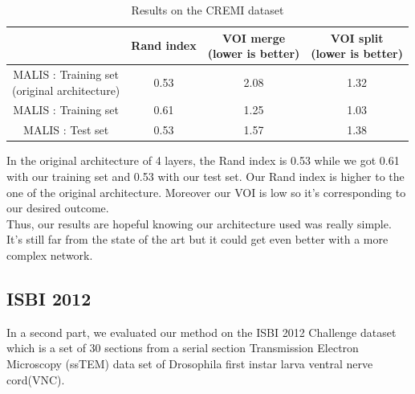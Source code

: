 \begin{table}[!htbp]
	\centering
	\begin{tabular}{|c|c|c|c|}
		\hline
		& Rand index & \thead{VOI merge \\(lower is better)} & \thead{VOI split\\(lower is better)} \\
		\hline
		\makecell{MALIS : Training set \\(original architecture)} & 0.53 & 2.08 & 1.32\\
		\hline
		MALIS : Training set & 0.61 & 1.25 & 1.03\\
		\hline
		MALIS : Test set & 0.53 & 1.57 & 1.38\\
		\hline
	\end{tabular}
	\caption{Results on the CREMI dataset}
\label{tab:cremi_res}
\end{table}

In the original architecture of 4 layers, the Rand index is 0.53 while we got 0.61 with our training set and 0.53 with our test set.
Our Rand index is higher to the one of the original architecture.
Moreover our VOI is low so it's corresponding to our desired outcome.\\

Thus, our results are hopeful knowing our architecture used was really simple.\\ 
It's still far from the state of the art but it could get even better with a more complex network.\\

\subsection{ISBI 2012}
In a second part, we evaluated our method on the ISBI 2012 Challenge dataset which is a set of 30 sections from a serial section Transmission Electron Microscopy (ssTEM) data set of Drosophila first instar larva ventral nerve cord(VNC).\\

